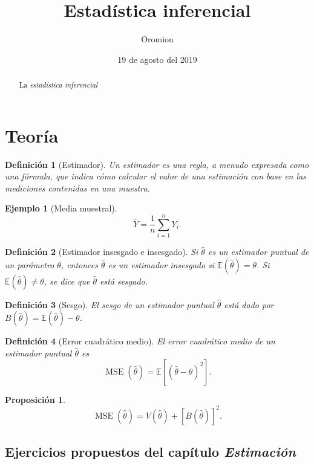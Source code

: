 \documentclass[a4paper]{scrreprt}
\title{Estadística inferencial}
\author{Oromion}
\date{19 de agosto del 2019}
\newtheorem{definition}{Definición}
\newtheorem{example}{Ejemplo}
\newtheorem{proposition}{Proposición}
\begin{document}
\maketitle
\tableofcontents

\begin{abstract}
	La \emph{estadística inferencial}
\end{abstract}

\part{Teoría}

\begin{definition}[Estimador]
	Un estimador es una regla, a menudo expresada como una fórmula, que indica cómo calcular el valor de una estimación con base en las mediciones contenidas en una muestra.
\end{definition}

\begin{example}[Media muestral]
	\[ \overline{Y}=\frac{1}{n}\sum_{i=1}^{n}Y_{i}. \]
\end{example}

\begin{definition}[Estimador insesgado e insesgado]
	Si $\hat{\theta}$ es un estimador puntual de un parámetro $\theta$, entonces $\hat{\theta}$ es un \emph{estimador insesgado} si $\mathds{E}\left(\hat{\theta}\right)=\theta$. Si $\mathds{E}\left(\hat{\theta}\right)\neq\theta$, se dice que $\hat{\theta}$ está \emph{sesgado}.
\end{definition}

\begin{definition}[Sesgo]
	El \emph{sesgo} de un estimador puntual $\hat{\theta}$ está dado por $B\left(\hat{\theta}\right)=\mathds{E}\left(\hat{\theta}\right)-\theta$.
\end{definition}

\begin{definition}[Error cuadrático medio]
	El \emph{error cuadrático medio} de un estimador puntual $\hat{\theta}$ es \[ \operatorname{MSE}\left(\hat{\theta}\right)=\mathds{E}\left[{\left(\hat{\theta}-\theta\right)}^{2}\right]. \]
\end{definition}

\begin{proposition}
	\[ \operatorname{MSE}\left(\hat{\theta}\right)=V\left(\hat{\theta}\right)+{\left[B\left(\hat{\theta}\right)\right]}^{2}. \]
\end{proposition}
\chapter{Ejercicios propuestos del capítulo \emph{Estimación}}
\end{document}
